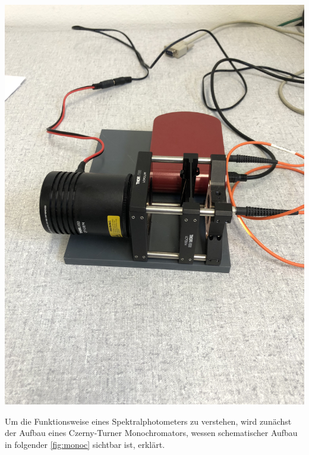 \documentclass[11pt,ngerman]{scrartcl}
\begin{document}
\begin{center}
	\begin{minipage}{0.5\textwidth}
		\includegraphics[angle=-90, width=\textwidth]{aufbau}
		\label{fig:aufbau}
	\end{minipage}
\end{center}

\noindent Um die Funktionsweise eines Spektralphotometers zu verstehen, wird
zunächst der Aufbau eines Czerny-Turner Monochromators, wessen schematischer
Aufbau in folgender \autoref{fig:monoc} sichtbar ist, erklärt.
\end{document}
